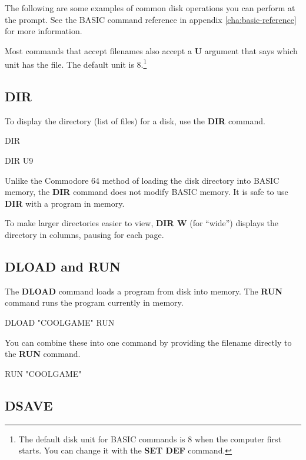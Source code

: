 The following are some examples of common disk operations you can perform at the  prompt. See the BASIC command reference in appendix \vref{cha:basic-reference} for more information.

Most commands that accept filenames also accept a {\bf U} argument that says which unit has the file. The default unit is 8.\footnote{The default disk unit for BASIC commands is 8 when the computer first starts. You can change it with the {\bf SET DEF} command.}

\subsection{DIR}

To display the directory (list of files) for a disk, use the {\bf DIR} command.

\begin{screencode}
DIR

DIR U9
\end{screencode}

Unlike the Commodore 64 method of loading the disk directory into BASIC memory, the {\bf DIR} command does not modify BASIC memory. It is safe to use {\bf DIR} with a program in memory.

To make larger directories easier to view, {\bf DIR W} (for ``wide'') displays the directory in columns, pausing for each page.

\subsection{DLOAD and RUN}

The {\bf DLOAD} command loads a program from disk into memory. The {\bf RUN} command runs the program currently in memory.

\begin{screencode}
DLOAD "COOLGAME"
RUN
\end{screencode}

You can combine these into one command by providing the filename directly to the {\bf RUN} command.

\begin{screencode}
RUN "COOLGAME"
\end{screencode}

\subsection{DSAVE}

